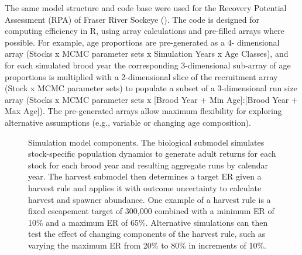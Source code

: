 \documentclass[french,11pt]{book}
\begin{document}
The same model structure and code base were used for the Recovery Potential Assessment (RPA) of Fraser River Sockeye (). The code is designed for computing efficiency in R, using array calculations and pre-filled arrays where possible. For example, age proportions are pre-generated as a 4- dimensional array (Stocks x MCMC parameter sets x Simulation Years x Age Classes), and for each simulated brood year the corresponding 3-dimensional sub-array of age proportions is multiplied with a 2-dimensional slice of the recruitment array (Stock x MCMC parameter sets) to populate a subset of a 3-dimensional run size array (Stocks x MCMC parameter sets x {[}Brood Year + Min Age{]}:{[}Brood Year + Max Age{]}). The pre-generated arrays allow maximum flexibility for exploring alternative assumptions (e.g., variable or changing age composition).

\clearpage


\begin{figure}[htb]

{\centering {} 

}

\caption{Simulation model components. The biological submodel simulates stock-specific population dynamics to generate adult returns for each stock for each brood year and resulting aggregate runs by calendar year. The harvest submodel then determines a target ER given a harvest rule and applies it with outcome uncertainty to calculate harvest and spawner abundance. One example of a harvest rule is a fixed escapement target of 300,000 combined with a minimum ER of 10\% and a maximum ER of 65\%. Alternative simulations can then test the effect of changing components of the harvest rule, such as varying the maximum ER from 20\% to 80\% in increments of 10\%.}\label{fig:SimModelFlowchart}
\end{figure}
\clearpage
\end{document}
